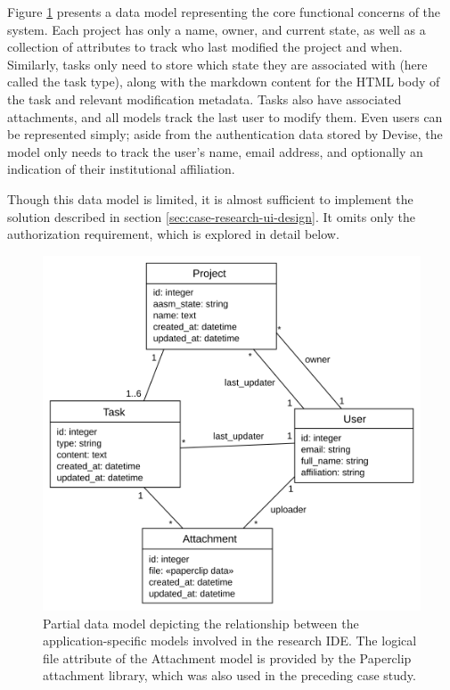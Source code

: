 \documentclass[document.tex]{subfiles}
\begin{document}
Figure \ref{fig:case-research-data-model} presents a data model representing the core functional concerns of the system. Each project has only a name, owner, and current state, as well as a collection of attributes to track who last modified the project and when. Similarly, tasks only need to store which state they are associated with (here called the task type), along with the markdown content for the HTML body of the task and relevant modification metadata. Tasks also have associated attachments, and all models track the last user to modify them. Even users can be represented simply; aside from the authentication data stored by Devise, the model only needs to track the user's name, email address, and optionally an indication of their institutional affiliation.

Though this data model is limited, it is almost sufficient to implement the solution described in section \ref{sec:case-research-ui-design}. It omits only the authorization requirement, which is explored in detail below.

\begin{figure}[!ht]
\centering \includegraphics[width=5.0in]{./img/case-study-research-railgun/data-model}
\caption{Partial data model depicting the relationship between the application-specific models involved in the research IDE. The logical file attribute of the Attachment model is provided by the Paperclip attachment library, which was also used in the preceding case study.}
\label{fig:case-research-data-model}
\end{figure}
\end{document}
